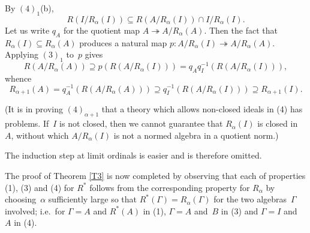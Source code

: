 \documentclass[11pt]{article}
\newcounter{arbenum}
\newenvironment{arbenumerate}{\begin{list}{{\rm(\arabic{arbenum})}}%
{\usecounter{arbenum}}}{\end{list}}
\newcommand{\ie}{i.e.\ }
\newcommand{\sseq}{\subseteq}
\newcommand{\closure}[1]{\overline{#1}}
\newcommand{\al}{\alpha}
\newcommand{\lm}{\lambda}
\newcommand{\onto}{\twoheadrightarrow}
\newenvironment{Proof}{{\it Proof. }}{}%
\newcommand{\Detail}[1]{}
\newcommand{\Rstar}{R^*}
\begin{document}
\begin{Proof}
\begin{arbenumerate}
By $(4)_1$(b),
$$R(I/R_\al(I)) \sseq R(A/R_\al(I)) \cap I/R_\al(I).$$
Let us write $q_A$ for the quotient map $A \onto A/R_\al(A)$.  Then
the fact that $R_\al(I) \sseq R_\al(A)$ produces a natural map
$p:A/R_\al(I) \onto A/R_\al(A)$.   Applying $(3)_1$ to~$p$ gives
$$R(A/R_\al(A)) \supseteq p(R(A/R_\al(I))) = q_Aq_I^{-1}(R(A/R_\al(I))),$$
whence
$$R_{\al+1}(A) = q_A^{-1}(R(A/R_\al(A))) \supseteq q_I^{-1}(R(A/R_\al(I)))
									\supseteq R_{\al+1}(I).$$
\end{arbenumerate}
(It is in proving $(4)_{\al+1}$ that a theory which allows non-closed ideals
in (4) has problems.    If~$I$ is not closed, then we cannot guarantee that
$R_\al(I)$ is closed in~$A$, without which $A/R_\al(I)$ is not a normed algebra
in a quotient norm.)

The induction step at limit ordinals is easier and is therefore omitted.
\Detail{ Suppose that $(1)_\al$,
$(3)_\al$ and $(4)_\al$ hold for all ordinals $\al < \lm$, where~$\lm$ is a
limit ordinal.   We show that $R_\lm$ satisfies (1), (3) and (4).
\begin{arbenumerate}
\item
We have
$$R_\lm(R_\lm(A)) =
\closure{\bigcup_{\al<\lm} R_\al(R_\lm(A))}.$$
Now each $R_\al(A)$ is a closed ideal of~$A$ and so of $R_\lm(A)$.  Therefore
$(4)_\al$ implies
$$R_\al(R_\al(A)) \sseq R_\al\left(R_\lm(A)\right).$$
Hence, using $(1)_\al$,
$$R_\lm(R_\lm(A)) \supseteq \closure{\bigcup_{\al<\lm} R_\al(R_\al(A))}
= \closure{\bigcup_{\al<\lm} R_\al(A)} = R_\lm(A).$$
\addtocounter{arbenum}{1}
\item If $A,B$ are Banach algebras and $\phi:A \onto B$ is a
continuous epimorphism, then, by $(3)_\al$, we have
$\phi(R_\al(A))\sseq R_\al(B)$, for each $\al<\lm$.  Therefore
$$\phi\left(\bigcup_{\al<\lm}R_\al(A)\right)
=     \bigcup_{\al<\lm}\phi\left(R_\al(A)\right)
\sseq \bigcup_{\al<\lm}R_\al(B).$$
Then
$$\phi(R_\lm(A)) = \phi\left(\closure{\bigcup_{\al<\lm}R_\al(A)}\right)
\sseq  \closure{\phi\left(\bigcup_{\al<\lm}R_\al(A)\right)}
\sseq  \closure{\bigcup_{\al<\lm}R_\al(B)} = R_\lm(B).$$
\item
If $I$ is a closed ideal of~$A$ then $R_\al(I)$ is a closed ideal of~$A$
for every $\al<\lm$.  Therefore $\bigcup_{\al<\lm}R_\al(I)$ is an ideal
of~$A$ and $R_\lm(I)$ is a closed ideal of~$A$.
Likewise, $R_\al(I) \sseq R_\al(A) \cap I$ for every $\al<\lm$, whence,
on taking unions and closures, $R_\lm(I) \sseq R_\lm(A) \cap I$.
\end{arbenumerate}}

The proof of Theorem \ref{T3} is now completed by observing that each of
properties (1), (3) and (4) for $\Rstar$ follows from the corresponding property
for $R_\al$ by choosing~$\al$ sufficiently large so that $\Rstar(\Gamma) =
R_\al(\Gamma)$ for the two algebras~$\Gamma$ involved; \ie for $\Gamma = A$ and
$\Rstar(A)$ in (1), $\Gamma=A$ and~$B$ in (3) and $\Gamma = I$ and~$A$ in (4).
\end{Proof}
\end{document}

